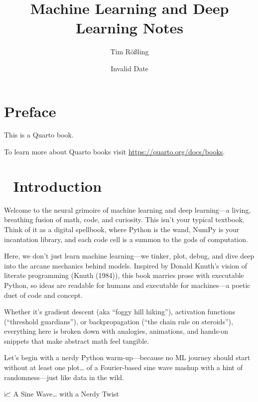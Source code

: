 \documentclass[
  letterpaper,
  DIV=11,
  numbers=noendperiod]{scrreprt}
\title{Machine Learning and Deep Learning Notes}
\author{Tim Rößling}
\date{Invalid Date}
\renewcommand*\contentsname{Table of contents}
\newcommand\contentsname{Table of contents}
\begin{document}
\maketitle

\renewcommand*\contentsname{Table of contents}
{
\hypersetup{linkcolor=}
\setcounter{tocdepth}{2}
\tableofcontents
}


\chapter*{Preface}\label{preface}


This is a Quarto book.

To learn more about Quarto books visit
\url{https://quarto.org/docs/books}.


\chapter{🚀 Introduction}\label{introduction}

Welcome to the neural grimoire of machine learning and deep learning---a
living, breathing fusion of math, code, and curiosity. This isn't your
typical textbook. Think of it as a digital spellbook, where Python is
the wand, NumPy is your incantation library, and each code cell is a
summon to the gods of computation.

Here, we don't just learn machine learning---we tinker, plot, debug, and
dive deep into the arcane mechanics behind models. Inspired by Donald
Knuth's vision of literate programming (Knuth (1984)), this book marries
prose with executable Python, so ideas are readable for humans and
executable for machines---a poetic duet of code and concept.

Whether it's gradient descent (aka ``foggy hill hiking''), activation
functions (``threshold guardians''), or backpropagation (``the chain
rule on steroids''), everything here is broken down with analogies,
animations, and hands-on snippets that make abstract math feel tangible.

Let's begin with a nerdy Python warm-up---because no ML journey should
start without at least one plot\ldots{} of a Fourier-based sine wave
mashup with a hint of randomness---just like data in the wild.

📈 A Sine Wave\ldots{} with a Nerdy Twist
\end{document}
